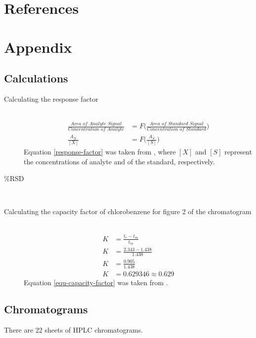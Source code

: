 \documentclass[a4paper, 12pt]{article}
\begin{document}
\section{References}
\printbibliography


\section{Appendix}

\subsection{Calculations}

\begin{description}
	\item[Calculating the response factor] \hfill \\
		\begin{equation} \label{response-factor}
		\begin{split}
			\frac{\textit{Area of Analyte Signal}}{\textit{Concentration of Analyte}} & = F\Bigg(\frac{\textit{Area of Standard Signal}}{\textit{Concentration of Standard}}\Bigg) \\
			\frac{A_X}{[X]} & = F\Bigg(\frac{A_S}{[S]}\Bigg)
		\end{split}
		\end{equation}
			Equation \ref{response-factor} was taken from \cite{harris}, where $[X]$ and $[S]$ represent the concentrations of analyte and of the standard, respectively.

	\item[$\%$RSD] \hfill \\

	\item[Calculating the capacity factor of chlorobenzene for figure 2 of the chromatogram] \hfill \\
		\begin{equation} \label{equ-capacity-factor}
			\begin{split}
				K & = \frac{t_r - t_m}{t_m} \\
				K & = \frac{2.343 - 1.438}{1.438} \\
				K & = \frac{0.905}{1.438} \\
				K & = 0.629346 \approx 0.629
			\end{split}
		\end{equation}
		Equation \ref{equ-capacity-factor} was taken from \cite{harris}.
\end{description}

\subsection{Chromatograms}
There are 22 sheets of HPLC chromatograms.

\end{document}
